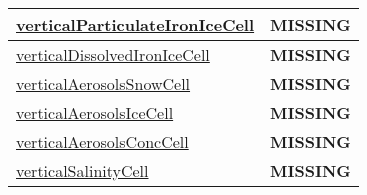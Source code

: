 {\begin{center}
\begin{longtable}{| p{2.0in} | p{4.0in} |}
    \hline
    \hyperref[subsec:var_sec_tracers_aggregate_verticalParticulateIronIceCell]{verticalParticulateIronIceCell} & {\bf \color{red} MISSING} \\
    \hline
    \hyperref[subsec:var_sec_tracers_aggregate_verticalDissolvedIronIceCell]{verticalDissolvedIronIceCell} & {\bf \color{red} MISSING} \\
    \hline
    \hyperref[subsec:var_sec_tracers_aggregate_verticalAerosolsSnowCell]{verticalAerosolsSnowCell} & {\bf \color{red} MISSING} \\
    \hline
    \hyperref[subsec:var_sec_tracers_aggregate_verticalAerosolsIceCell]{verticalAerosolsIceCell} & {\bf \color{red} MISSING} \\
    \hline
    \hyperref[subsec:var_sec_tracers_aggregate_verticalAerosolsConcCell]{verticalAerosolsConcCell} & {\bf \color{red} MISSING} \\
    \hline
    \hyperref[subsec:var_sec_tracers_aggregate_verticalSalinityCell]{verticalSalinityCell} & {\bf \color{red} MISSING} \\
    \hline
\end{longtable}
\end{center}
}
